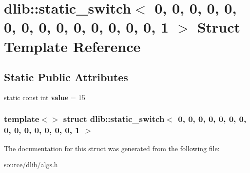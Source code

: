 \hypertarget{structdlib_1_1static__switch_3_010_00_010_00_010_00_010_00_010_00_010_00_010_00_010_00_010_00_0146ef5bf350d722d5ffb766430493f3da}{
\section{dlib::static\_\-switch$<$ 0, 0, 0, 0, 0, 0, 0, 0, 0, 0, 0, 0, 0, 0, 1 $>$ Struct Template Reference}
\label{structdlib_1_1static__switch_3_010_00_010_00_010_00_010_00_010_00_010_00_010_00_010_00_010_00_0146ef5bf350d722d5ffb766430493f3da}
}
\subsection*{Static Public Attributes}
\begin{DoxyCompactItemize}
\item 
\hypertarget{structdlib_1_1static__switch_3_010_00_010_00_010_00_010_00_010_00_010_00_010_00_010_00_010_00_0146ef5bf350d722d5ffb766430493f3da_ae64db4bea8dac380fcc96e5214165f2b}{
static const int {\bfseries value} = 15}
\label{structdlib_1_1static__switch_3_010_00_010_00_010_00_010_00_010_00_010_00_010_00_010_00_010_00_0146ef5bf350d722d5ffb766430493f3da_ae64db4bea8dac380fcc96e5214165f2b}

\end{DoxyCompactItemize}
\subsubsection*{template$<$$>$ struct dlib::static\_\-switch$<$ 0, 0, 0, 0, 0, 0, 0, 0, 0, 0, 0, 0, 0, 0, 1 $>$}



The documentation for this struct was generated from the following file:\begin{DoxyCompactItemize}
\item 
source/dlib/algs.h\end{DoxyCompactItemize}
